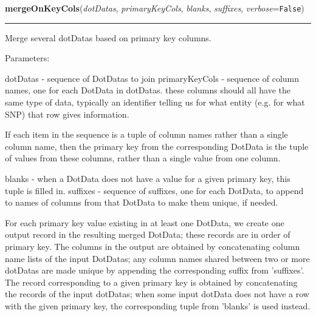 \hspace{.8\funcindent}\begin{boxedminipage}{\funcwidth}

    \raggedright \textbf{mergeOnKeyCols}(\textit{dotDatas}, \textit{primaryKeyCols}, \textit{blanks}, \textit{suffixes}, \textit{verbose}={\tt False})

    \vspace{-1.5ex}

    \rule{\textwidth}{0.5\fboxrule}
\setlength{\parskip}{2ex}
    Merge several dotDatas based on primary key columns.

    Parameters:

    dotDatas - sequence of DotDatas to join primaryKeyCols - sequence of 
    column names, one for each DotData in dotDatas. these columns should 
    all have the same type of data, typically an identifier telling us for 
    what entity (e.g. for what SNP) that row gives information.

    If each item in the sequence is a tuple of column names rather than a 
    single column name, then the primary key from the corresponding DotData
    is the tuple of values from these columns, rather than a single value 
    from one column.

    blanks - when a DotData does not have a value for a given primary key, 
    this tuple is filled in. suffixes - sequence of suffixes, one for each 
    DotData, to append to names of columns from that DotData to make them 
    unique, if needed.

    For each primary key value existing in at least one DotData, we create 
    one output record in the resulting merged DotData; these records are in
    order of primary key.   The columns in the output are obtained by 
    concatenating column name lists of the input DotDatas; any column names
    shared between two or more dotDatas are made unique by appending the 
    corresponding suffix from 'suffixes'.   The record corresponding to a 
    given primary key is obtained by concatenating the records of the input
    dotDatas; when some input dotData does not have a row with the given 
    primary key, the corresponding tuple from 'blanks' is used instead.

\setlength{\parskip}{1ex}
    \end{boxedminipage}

    \label{Classes:DotData:DotData:numCols}

